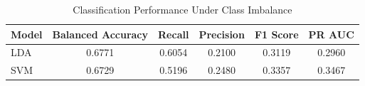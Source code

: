 \begin{table}[htbp]
\caption{Classification Performance Under Class Imbalance}
\label{tab:perf}
\centering
\begin{tabular}{lccccc}
\toprule
Model & Balanced Accuracy & Recall & Precision & F1 Score & PR AUC \\
\midrule
LDA & 0.6771 & 0.6054 & 0.2100 & 0.3119 & 0.2960 \\
SVM & 0.6729 & 0.5196 & 0.2480 & 0.3357 & 0.3467 \\
\bottomrule
\end{tabular}
\end{table}
